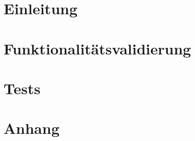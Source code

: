 

	\maketitle
	\setcounter{tocdepth}{1}
	\tableofcontents

	\chapter{Einleitung}
		
	\chapter{Funktionalitätsvalidierung}
		
	\chapter{Tests}
	\label{chap:test}
		
	\chapter{Anhang}
	\label{anhang}
		

